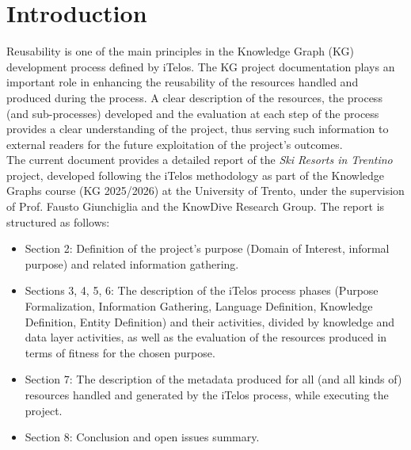 \section{Introduction}
Reusability is one of the main principles in the Knowledge Graph (KG) development process defined by iTelos. The KG project documentation plays an important role in enhancing the reusability of the resources handled and produced during the process. A clear description of the resources, the process (and sub-processes) developed and the evaluation at each step of the process provides a clear understanding of the project, thus serving such information to external readers for the future exploitation of the project's outcomes.\\

\noindent The current document provides a detailed report of the \textit{Ski Resorts in Trentino} project, developed following the iTelos methodology as part of the Knowledge Graphs course (KG 2025/2026) at the University of Trento, under the supervision of Prof. Fausto Giunchiglia and the KnowDive Research Group. The report is structured as follows:
\begin{itemize}
    \item Section 2: Definition of the project's purpose (Domain of Interest, informal purpose) and related information gathering.

    \item Sections 3, 4, 5, 6: The description of the iTelos process phases (Purpose Formalization, Information Gathering, Language Definition, Knowledge Definition, Entity Definition) and their activities, divided by knowledge and data layer activities, as well as the evaluation of the resources produced in terms of fitness for the chosen purpose.

    \item Section 7: The description of the metadata produced for all (and all kinds of) resources handled and generated by the iTelos process, while executing the project.

    \item Section 8: Conclusion and open issues summary.
\end{itemize}
